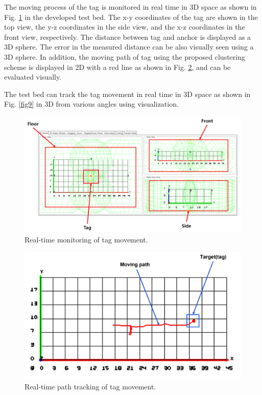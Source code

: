 \documentclass[conference]{IEEEtran}
\begin{document}
The moving process of the tag is monitored in real time in 3D space as shown in Fig. \ref{fig7} in the developed test bed. The x-y coordinates of the tag are shown in the top view, the y-z coordinates in the side view, and the x-z coordinates in the front view, respectively. The distance between tag and anchor is displayed as a 3D sphere. The  error in the measured distance can be also visually seen using a 3D sphere. In addition, the moving path of tag using the proposed clustering scheme is displayed in 2D with a red line as shown in Fig. \ref{fig8}, and can be evaluated visually.

The test bed can track the tag movement in real time in 3D space as shown in Fig. \ref{fig9} in 3D from various angles using visualization.


\begin{figure}[htbp]
    \centerline{\includegraphics[width=1.0\columnwidth]{fig6.png}}
    \caption{Real-time monitoring of tag movement.}
    \label{fig7}
\end{figure}


\begin{figure}[htbp]
    \centerline{\includegraphics[width=0.9\columnwidth]{fig7.png}}
    \caption{Real-time path tracking of tag movement.}
    \label{fig8}
\end{figure}
\end{document}

